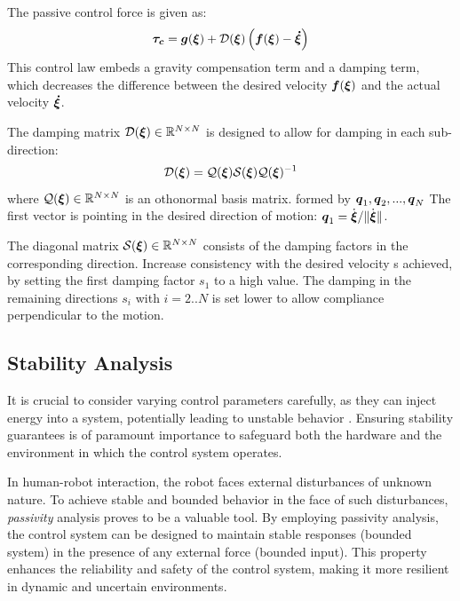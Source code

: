 The passive control force \cite{kronander2015passive} is given as:
\begin{equation}
	\vecs{\tau_c} = \vect g (\vecs\xi) 
	+ \matd{D}(\vecs\xi) \left(\vecs f(\vecs\xi) - \vecs{\dot\xi} \right) 
\label{eq:control_command}
\end{equation}
This control law embeds a gravity compensation term and a damping term, which decreases the difference between the desired velocity $\boldsymbol{f}(\boldsymbol{\xi})$ and the actual velocity $\boldsymbol{\dot\xi}$.

The damping matrix $\mathcal{D}(\boldsymbol{\xi}) \in \mathbb{R}^{N \times N}$ is designed to allow for damping in each sub-direction:
\begin{equation}
   \matd {D}(\vecs \xi) = \matd{Q}(\vecs\xi)\matd{S}(\vecs\xi) \matd{Q} (\vecs \xi)^{-1}
\label{eq:damping_matrix}
\end{equation}
where $\mathcal{Q}(\boldsymbol{\xi}) \in \mathbb{R}^{N \times N}$ is an othonormal basis matrix. 
formed by $\boldsymbol{q}_1, \boldsymbol{q}_2, ..., \boldsymbol{q}_N$ The first vector is pointing in the desired direction of motion: $\boldsymbol{q}_1 = \dot{\boldsymbol{\xi}} / \lVert \dot{\boldsymbol{\xi}} \rVert$.

The diagonal matrix $\mathcal{S}(\boldsymbol{\xi}) \in \mathbb{R}^{N \times N}$ consists of the damping factors in the corresponding direction.
Increase consistency with the desired velocity s achieved, by setting the first damping factor $s_1$ to a high value. The damping in the remaining directions $s_i$ with $i = 2 .. N$ is set lower to allow compliance perpendicular to the motion. 

\subsection{Stability Analysis} \label{sec:trad_passive}
It is crucial to consider varying control parameters carefully, as they can inject energy into a system, potentially leading to unstable behavior \cite{ferraguti2013tank}. Ensuring stability guarantees is of paramount importance to safeguard both the hardware and the environment in which the control system operates.

In human-robot interaction, the robot faces external disturbances of unknown nature. To achieve stable and bounded behavior in the face of such disturbances, \textit{passivity} analysis proves to be a valuable tool. By employing passivity analysis, the control system can be designed to maintain stable responses (bounded system) in the presence of any external force (bounded input). This property enhances the reliability and safety of the control system, making it more resilient in dynamic and uncertain environments.

